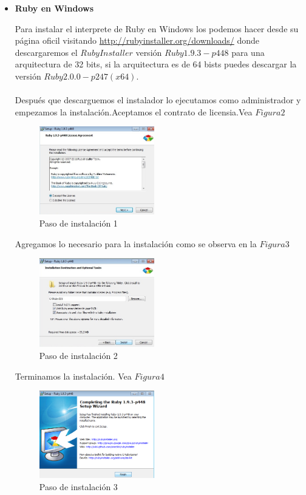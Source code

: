 \documentclass[11pt]{article} %
\begin{document}
\begin{itemize}
\item{\bf Ruby en Windows}

Para instalar el interprete de Ruby en Windows los podemos hacer desde su página oficil visitando  \url{http://rubyinstaller.org/downloads/}  donde descargaremos el $Ruby Installer$ versión $Ruby 1.9.3-p448$ para una arquitectura de 32 bits, si la arquitectura es de 64 bists puedes descargar la versión $Ruby 2.0.0-p247 (x64)$.\\ \\

Después que descarguemos el instalador lo ejecutamos como administrador y empezamos la instalación.Aceptamos el contrato de licensia.Vea $Figura 2$

\begin{figure}[h]
\centering
 \includegraphics[width=5cm]{./imagenes/PasoInst1.jpg}
\caption{Paso de instalación 1}\label{Fig:Paso1}
\end{figure}

Agregamos lo necesario para la instalación como se observa en la $ Figura 3$

\begin{figure}[h]
\centering
 \includegraphics[width=5cm]{./imagenes/PasoInst2.jpg}
\caption{Paso de instalación 2}\label{Fig:Paso2}
\end{figure}

Terminamos la instalación. Vea  $Figura 4$

\begin{figure}[h]
\centering
 \includegraphics[width=5cm]{./imagenes/PasoInst3.jpg}
\caption{Paso de instalación 3}\label{Fig:Paso3}
\end{figure}


\end{itemize}
\end{document}
